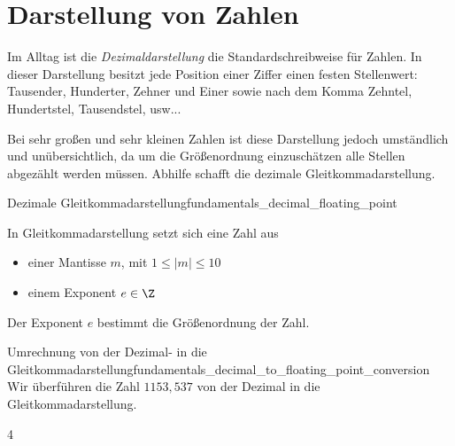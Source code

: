 \section{Darstellung von Zahlen}
\label{sec:fundamentals_number_representation}

Im Alltag ist die \emph{Dezimaldarstellung} die Standardschreibweise für
Zahlen. In dieser Darstellung besitzt jede Position einer Ziffer einen festen
Stellenwert: Tausender, Hunderter, Zehner und Einer sowie nach dem Komma Zehntel,
Hundertstel, Tausendstel, usw...

{\centering
  \par}

Bei sehr großen und sehr kleinen Zahlen ist diese Darstellung jedoch umständlich
und unübersichtlich, da um die Größenordnung einzuschätzen alle Stellen abgezählt
werden müssen. Abhilfe schafft die dezimale Gleitkommadarstellung.

\begin{DefinitionBox}{Dezimale Gleitkommadarstellung}{fundamentals_decimal_floating_point}
  \noindent
  \begin{minipage}[c]{0.67\linewidth}
    In Gleitkommadarstellung setzt sich eine Zahl aus
    \begin{itemize}
      \item einer Mantisse $m$, mit $1 \leq |m| \leq 10$
      \item einem Exponent $e\in\Z$
    \end{itemize}
  \end{minipage}\hfill
  \begin{minipage}[c]{0.3\linewidth}
    \centering
  \end{minipage}
  Der Exponent $e$ bestimmt die Größenordnung der Zahl.
\end{DefinitionBox}

\begin{ExampleBox}{Umrechnung von der Dezimal- in die Gleitkommadarstellung}{fundamentals_decimal_to_floating_point_conversion}
  Wir überführen die Zahl $1153{,}537$ von der Dezimal in die Gleitkommadarstellung.
  \begin{ClozeArea}[34]{4}
    \centering
  \end{ClozeArea}
\end{ExampleBox}

